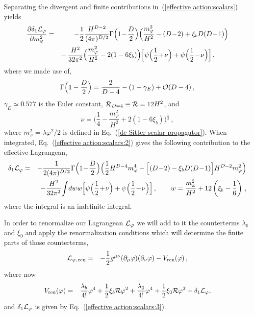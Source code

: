 Separating the divergent and finite contributions
in~(\ref{effective action:scalars}) yields
\begin{eqnarray}
  \frac{\partial \delta_1{\cal L}_\varphi}{\partial m_\varphi^2}
   &=& -\frac12\frac{H^{D-2}}{(4\pi)^{D/2}}\Gamma\Big(1\!-\!\frac{D}{2}\Big)
           \Big(\frac{m_\varphi^2}{H^2}
              - (D\!-\!2) + \xi_b D(D\!-\!1)
           \Big)
\nonumber\\
&&  -\,
\frac{H^2}{32\pi^2}\Big(\frac{m_\varphi^2}{H^2}-2(1-6\xi_b)\Big)
          \Big[\psi\Big(\frac{1}{2}\!+\!\nu\Big)
              +\psi\Big(\frac{1}{2}\!-\!\nu\Big)\Big]
\,,\qquad
\label{effective action:scalars:2}
\end{eqnarray}
where we made use of,
\begin{equation}
\Gamma\Big(1-\frac{D}{2}\Big) = \frac{2}{D-4} - (1-\gamma_E) + {\cal O}(D-4)
\,,
\label{Gamma 1-D/2}
\end{equation}
$\gamma_E \simeq 0.577$ is the Euler constant,
${\cal R}_{D=4}\equiv {\cal R} =12H^2$, and
\begin{equation}
\nu = \Big(\frac14 - \frac{m_\varphi^2}{H^2} +
2(1\!-\!6\xi_b)\Big)^{\frac12} \,,
\label{def:nu}
\end{equation}
where $m_\varphi ^2 = \lambda \varphi^2/2$ is defined in 
Eq.~(\ref{de Sitter scalar propagator}).
When integrated, Eq.~(\ref{effective action:scalars:2}) gives
the following contribution to the effective Lagrangean,
\begin{eqnarray}
\delta_1 {\cal L}_\varphi
    &=& -\frac{1}{2(4\pi)^{D/2}}\Gamma\Big(1\!-\!\frac{D}{2}\Big)
           \Big(\frac12H^{D-4}m_\varphi^4
          - \Big[(D\!-\!2)-\xi_b D(D\!-\!1)\Big]H^{D-2}m_\varphi^2\Big)
\label{effective action:scalars:3}
\\
&&\hskip 0.cm
     - \frac{H^{2}}{32\pi^2}
        \!\int\! dww
              \Big[\psi\Big(\frac{1}{2}\!+\!\nu\Big)
                              + \psi\Big(\frac{1}{2}\!-\!\nu\Big)\Big]\,,\qquad
w = \frac{m_\varphi^2}{H^2} +12\left(\xi_b-\frac16\right)\,,
\nonumber
\end{eqnarray}
where the integral is an indefinite integral.

In order to renormalize our Lagrangean ${\cal L}_\varphi $ we will
add to it the counterterms $\lambda_0$ and $\xi_0$ and apply
the renormalization conditions which will determine the finite parts
of those counterterms,
\begin{eqnarray}
{\cal L}_{\varphi,\,{\rm ren}} & = & - \frac12
g^{\mu\nu}(\partial_\mu\varphi)(\partial_\nu\varphi) -
V_{\mathrm{ren}}(\varphi)
\,,
\label{eff:lagrangean}
\end{eqnarray}
where now
\begin{eqnarray}
V_{\mathrm{ren}}(\varphi) & = & \frac{\lambda_b}{4!}\varphi^{4} +
\frac12 \xi_b \mathcal{R}\varphi^{2} +
\frac{\lambda_0}{4!}\varphi^{4} + \frac12 \xi_0
\mathcal{R}\varphi^{2} - \delta_1 {\cal L}_\varphi,
\label{Vren}
\end{eqnarray}
and $\delta_1 {\cal L}_\varphi$ is given by
Eq.~(\ref{effective action:scalars:3}).

